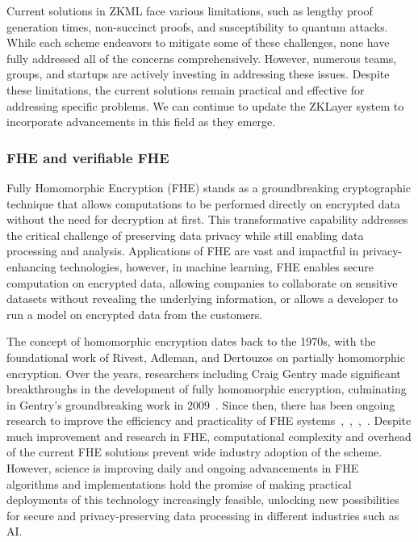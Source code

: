 \documentclass[conference]{IEEEtran}
\begin{document}
Current solutions in ZKML face various limitations, such as lengthy proof generation times, non-succinct proofs, and susceptibility to quantum attacks. While each scheme endeavors to mitigate some of these challenges, none have fully addressed all of the concerns comprehensively. However, numerous teams, groups, and startups are actively investing in addressing these issues. Despite these limitations, the current solutions remain practical and effective for addressing specific problems. We can continue to update the ZKLayer system to incorporate advancements in this field as they emerge.

\subsubsection{FHE and verifiable FHE}

Fully Homomorphic Encryption (FHE) stands as a groundbreaking cryptographic technique that allows computations to be performed directly on encrypted data without the need for decryption at first. This transformative capability addresses the critical challenge of preserving data privacy while still enabling data processing and analysis. Applications of FHE are vast and impactful in privacy-enhancing technologies, however, in machine learning, FHE enables secure computation on encrypted data, allowing companies to collaborate on sensitive datasets without revealing the underlying information, or allows a developer to run a model on encrypted data from the customers.

The concept of homomorphic encryption dates back to the 1970s, with the foundational work of Rivest, Adleman, and Dertouzos on partially homomorphic encryption. Over the years, researchers including Craig Gentry made significant breakthroughs in the development of fully homomorphic encryption, culminating in Gentry’s groundbreaking work in 2009~\cite{Gentry2009FullyHE}. Since then, there has been ongoing research to improve the efficiency and practicality of FHE systems~\cite{Dijk2010FullyHE},~\cite{Brakerski2012LeveledFH},~\cite{Gentry2013HomomorphicEF},~\cite{Cheon2017HomomorphicEF}. Despite much improvement and research in FHE, computational complexity and overhead of the current FHE solutions prevent wide industry adoption of the scheme. However, science is improving daily and ongoing advancements in FHE algorithms and implementations hold the promise of making practical deployments of this technology increasingly feasible, unlocking new possibilities for secure and privacy-preserving data processing in different industries such as AI.
\end{document}
